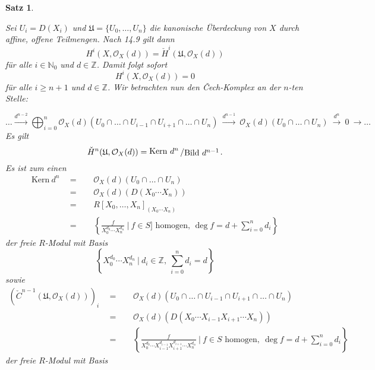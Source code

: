 \documentclass[11pt]{book}
\newtheorem{theorem}{Satz}[section]
\theoremstyle{nonumberbreak}
\newenvironment{pr}[1][]{\ifthenelse{\equal{#1}{}}{\proof}{\proof[#1]}\rm}{\endproof}
\newcommand{\bild}{\mathrm{Bild}\ }
\newcommand{\kernel}{\mathrm{Kern}\ }
\newcommand{\slant}[2]{{\raisebox{.1em}{$#1$}\left/\raisebox{-.1em}{$#2$}\right.}}
\begin{document}
\begin{spacing}{1.4}
\begin{theorem}
\begin{compactenum}
\end{compactenum}

\begin{pr}
\begin{compactenum}
\item Sei $U_i=D(X_i)$ und $\mathfrak{U}= \{U_0, \ldots, U_n\}$ die kanonische Überdeckung von $X$ durch affine, offene Teilmengen. Nach 14.9 gilt dann 
$$H^{i}(X, \mathcal{O}_X(d)) = \check{H}^{i}(\mathfrak{U}, \mathcal{O}_X(d))$$
für alle $i \in \mathbb{N}_0$ und $d\in \mathbb{Z}$. Damit folgt sofort
$$H^{i}(X, \mathcal{O}_X(d)) = 0$$
für alle $i \geqslant n+1$ und $d \in \mathbb{Z}$. Wir betrachten nun den \v{C}ech-Komplex an der $n$-ten Stelle:

$$\ldots \overset{d^{n-2}}{\rightarrow} \bigoplus_{i=0}^n \mathcal{O}_X(d)(U_0 \cap \ldots \cap U_{i-1} \cap U_{i+1} \cap \ldots \cap U_n) \ \overset{d^{n-1}}{\longrightarrow} \ \mathcal{O}_X(d)(U_0 \cap \ldots \cap U_n) \ \overset{d^{n}}{\rightarrow} \ 0 \ \rightarrow \ldots $$
Es gilt 
$$\check{H}^n(\mathfrak{U}, \mathcal{O}_X(d)) = \slant{\kernel d^{n}}{\bild d^{n-1}}.$$
Es ist zum einen 
\setlength{\abovedisplayskip}{5.5pt}
\setlength{\belowdisplayskip}{5.5pt}
\begin{alignat*}{5}
\kernel d^{n} \ \ &=&& \ \ \mathcal{O}_X(d)(U_0 \cap \ldots \cap U_n)\\
& =&& \ \ \mathcal{O}_X(d)(D(X_0 \cdots X_n))\\
&=&& \ \ R[X_0, \ldots, X_n]_{(X_0 \cdots X_n)}\\
&=&& \ \ \left\{ \frac{f}{X_0^{d_0} \cdots X_n^{d_n}} \ \bigg\vert  \ f \in S] \textrm{ homogen, } \deg f = d+ \sum_{i=0}^n d_i \right\}
\end{alignat*}
der freie $R$-Modul mit Basis 
$$\left\{ X_0^{d_0} \cdots X_n^{d_n} \ \bigg\vert \ d_i \in \mathbb{Z}, \ \sum_{i=0}^n d_i = d \right\}$$
sowie 
\setlength{\abovedisplayskip}{5.5pt}
\setlength{\belowdisplayskip}{5.5pt}
\begin{alignat*}{5}
\left(\check{C}^{n-1}(\mathfrak{U}, \mathcal{O}_X(d))\right)_i \ \ &=&& \ \ \mathcal{O}_X(d)(U_0 \cap \ldots \cap U_{i-1} \cap U_{i+1} \cap \ldots \cap U_n) \\
&=&& \ \ \mathcal{O}_X(d)(D(X_0 \cdots X_{i-1}X_{i+1} \cdots X_n))\\
&=&& \ \ \left\{ \frac{f}{X_0^{d_0} \cdots X_{i-1}^{d_{i-1}} X_{i+1}^{d_{i+1}} \cdots X_n^{d_n}} \ \bigg\vert \ f \in S \textrm{ homogen}, \ \deg f = d + \sum_{i=0}^n d_i \right\}
\end{alignat*}
der freie $R$-Modul mit Basis 

\end{compactenum}
\end{pr}
\end{theorem}
\end{spacing}
\end{document}
